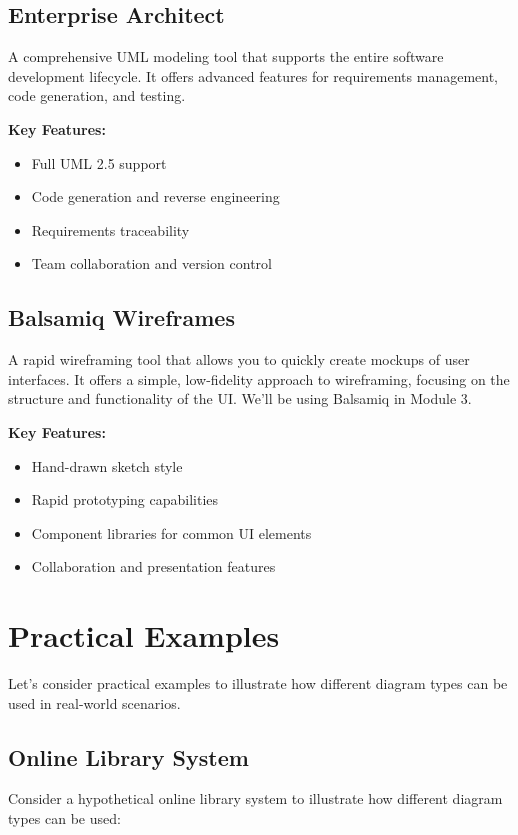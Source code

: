 \subsection{Enterprise Architect}

A comprehensive UML modeling tool that supports the entire software development lifecycle. It offers advanced features for requirements management, code generation, and testing.

\textbf{Key Features:}
\begin{itemize}
  \item Full UML 2.5 support
  \item Code generation and reverse engineering
  \item Requirements traceability
  \item Team collaboration and version control
\end{itemize}

\subsection{Balsamiq Wireframes}

A rapid wireframing tool that allows you to quickly create mockups of user interfaces. It offers a simple, low-fidelity approach to wireframing, focusing on the structure and functionality of the UI. We'll be using Balsamiq in Module 3.

\textbf{Key Features:}
\begin{itemize}
  \item Hand-drawn sketch style
  \item Rapid prototyping capabilities
  \item Component libraries for common UI elements
  \item Collaboration and presentation features
\end{itemize}

\section{Practical Examples}

Let's consider practical examples to illustrate how different diagram types can be used in real-world scenarios.

\subsection{Online Library System}

Consider a hypothetical online library system to illustrate how different diagram types can be used:

